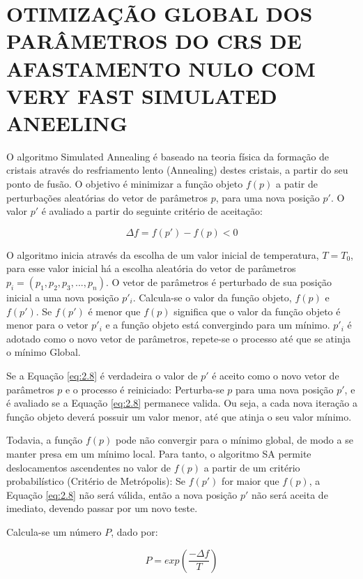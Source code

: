 \chapter{OTIMIZAÇÃO GLOBAL DOS PARÂMETROS DO CRS DE AFASTAMENTO NULO COM VERY FAST SIMULATED ANEELING}
\label{vfsa}

O algoritmo Simulated Annealing é baseado na teoria física da formação de cristais
através do resfriamento lento (Annealing) destes cristais, a partir do seu ponto de fusão.
O objetivo é minimizar a função objeto $f(p)$ a patir de perturbações aleatórias do vetor de parâmetros $p$,
para uma nova posição $p'$. O valor $p'$ é avaliado a partir do seguinte critério de aceitação:

\begin{equation}
\label{eq:2.8}
 \Delta f=f(p')-f(p) < 0
\end{equation}

O algoritmo inicia através da escolha de um valor inicial de temperatura, $T=T_0$, para esse valor inicial há
a escolha aleatória do vetor de parâmetros $p_i=(p_1,p_2,p_3,...,p_n)$. O vetor de parâmetros é perturbado 
de sua posição inicial a uma nova posição $p'_i$. Calcula-se o valor da função objeto, $f(p)$ e $f(p')$. Se $f(p')$ é
menor que $f(p)$ significa que o valor da função objeto é menor para o vetor $p'_i$
e a função objeto está convergindo para um mínimo. $p'_i$ é adotado como o
novo vetor de parâmetros, repete-se o processo até que se atinja o mínimo Global.

Se a Equação \ref{eq:2.8} é verdadeira o valor de $p'$ é aceito como o novo vetor de parâmetros $p$ e o processo
é reiniciado: Perturba-se $p$ para uma nova posição $p'$, e é avaliado se a Equação \ref{eq:2.8} permanece valida. 
Ou seja, a cada nova
iteração a função objeto deverá possuir um valor menor, até que atinja o seu valor mínimo.

Todavia, a função $f(p)$ pode não convergir para o mínimo global, de modo a se manter presa
em um mínimo local. Para tanto, o algoritmo SA permite deslocamentos ascendentes no valor de $f(p)$ a partir de um critério
probabilístico (Critério de Metrópolis): Se $f(p')$ for maior que $f(p)$, a Equação \ref{eq:2.8} não será válida, então
a nova posição $p'$ não será aceita de imediato, devendo passar por um novo teste.

Calcula-se um número $P$, dado por:

\begin{equation}
\label{eq:2.10}
 P=exp(\frac{-\Delta f}{T})
\end{equation}

